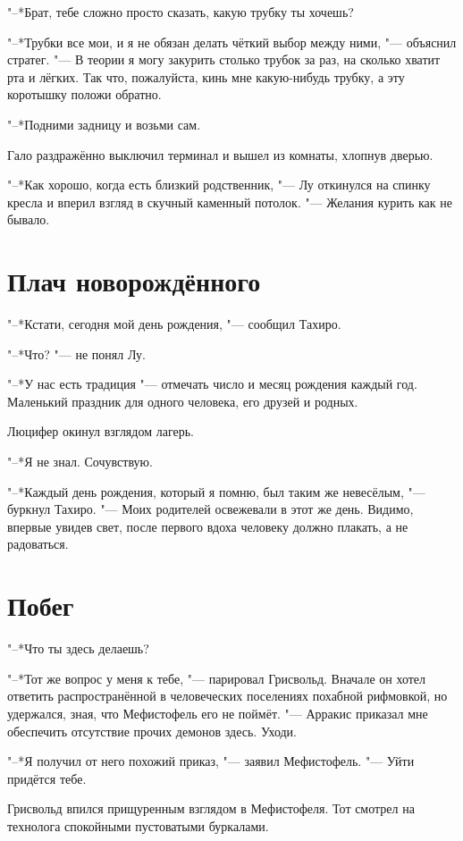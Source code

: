 \documentclass[a4paper,10pt]{book}
\begin{document}
"--*Брат, тебе сложно просто сказать, какую трубку ты хочешь?

"--*Трубки все мои, и я не обязан делать чёткий выбор между ними, "--- объяснил стратег. "--- В теории я могу закурить столько трубок за раз, на сколько хватит рта и лёгких. Так что, пожалуйста, кинь мне какую-нибудь трубку, а эту коротышку положи обратно.

"--*Подними задницу и возьми сам.

Гало раздражённо выключил терминал и вышел из комнаты, хлопнув дверью.

"--*Как хорошо, когда есть близкий родственник, "--- Лу откинулся на спинку кресла и вперил взгляд в скучный каменный потолок. "--- Желания курить как не бывало.

\section{Плач новорождённого}

"--*Кстати, сегодня мой день рождения, "--- сообщил Тахиро.

"--*Что? "--- не понял Лу.

"--*У нас есть традиция "--- отмечать число и месяц рождения каждый год. Маленький праздник для одного человека, его друзей и родных.

Люцифер окинул взглядом лагерь.

"--*Я не знал. Сочувствую.

"--*Каждый день рождения, который я помню, был таким же невесёлым, "--- буркнул Тахиро. "--- Моих родителей освежевали в этот же день. Видимо, впервые увидев свет, после первого вдоха человеку должно плакать, а не радоваться.

\section{Побег}

"--*Что ты здесь делаешь?

"--*Тот же вопрос у меня к тебе, "--- парировал Грисвольд. Вначале он хотел 
ответить распространённой в человеческих поселениях
похабной рифмовкой, но удержался, зная, что Мефистофель его не поймёт. "--- 
Арракис приказал мне обеспечить отсутствие прочих 
демонов здесь.
Уходи.

"--*Я получил от него похожий приказ, "--- заявил Мефистофель. "--- Уйти 
придётся тебе.

Грисвольд впился прищуренным взглядом в Мефистофеля. Тот смотрел на технолога 
спокойными пустоватыми буркалами.
\end{document}
